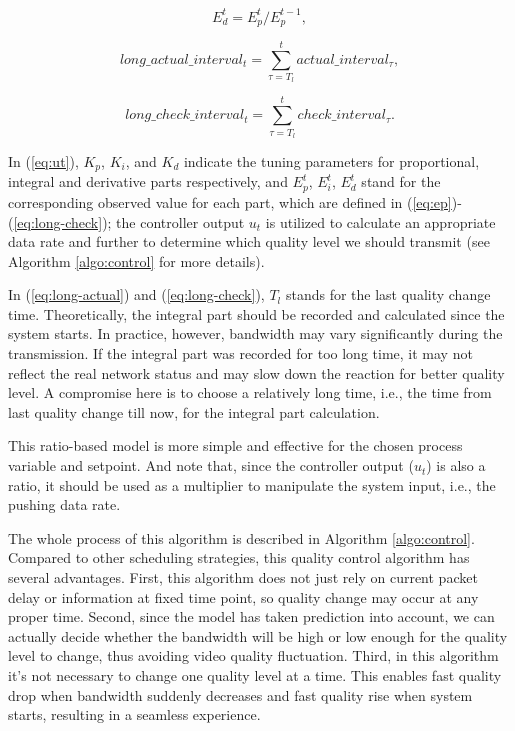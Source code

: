 \documentclass[journal]{IEEEtran}
\begin{document}
\begin{equation}
\label{eq:ed}
E_d^t = E_p^t/E_p^{t - 1} ,
\end{equation}

\begin{equation}
\label{eq:long-actual}
long\_actual\_interva{l_t} = \sum\limits_{\tau = {T_l}}^t {actual\_interva{l_\tau}} ,
\end{equation}

\begin{equation}
\label{eq:long-check}
long\_check\_interva{l_t} = \sum\limits_{\tau = {T_l}}^t {check\_interva{l_\tau}} .
\end{equation}


In (\ref{eq:ut}), $K_p$, $K_i$, and $K_d$ indicate the tuning parameters for proportional, integral and derivative parts respectively, and $E_p^t$, $E_i^t$, $E_d^t$ stand for the corresponding observed value for each part, which are defined in (\ref{eq:ep})-(\ref{eq:long-check}); the controller output $u_t$ is utilized to calculate an appropriate data rate and further to determine which quality level we should transmit (see Algorithm \ref{algo:control} for more details).

In (\ref{eq:long-actual}) and (\ref{eq:long-check}), $T_l$ stands for the last quality change time. Theoretically, the integral part should be recorded and calculated since the system starts. In practice, however, bandwidth may vary significantly during the transmission. If the integral part was recorded for too long time, it may not reflect the real network status and may slow down the reaction for better quality level. A compromise here is to choose a relatively long time, i.e., the time from last quality change till now, for the integral part calculation.

This ratio-based model is more simple and effective for the chosen process variable and setpoint. And note that, since the controller output ($u_t$) is also a ratio, it should be used as a multiplier to manipulate the system input, i.e., the pushing data rate.

The whole process of this algorithm is described in Algorithm \ref{algo:control}. Compared to other scheduling strategies, this quality control algorithm has several advantages. First, this algorithm does not just rely on current packet delay or information at fixed time point, so quality change may occur at any proper time. Second, since the model has taken prediction into account, we can actually decide whether the bandwidth will be high or low enough for the quality level to change, thus avoiding video quality fluctuation. Third, in this algorithm it's not necessary to change one quality level at a time. This enables fast quality drop when bandwidth suddenly decreases and fast quality rise when system starts, resulting in a seamless experience.
\end{document}
